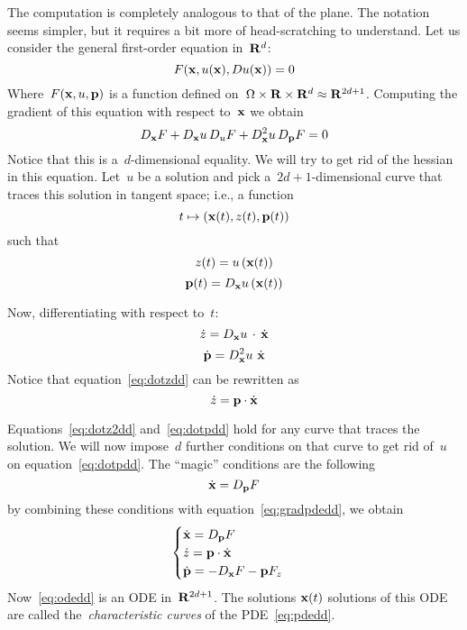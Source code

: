 The computation is completely analogous to that of the plane.  The notation
seems simpler, but it requires a bit more of head-scratching to understand.
Let us consider the general first-order equation in~$\mathbf{R}^d$:
\begin{equation}\label{eq:pdedd}
	F(\mathbf{x}, u(\mathbf{x}), Du(\mathbf{x})) = 0
\end{equation}
Where~$F(\mathbf{x},u,\mathbf{p})$ is a function defined
on~$\Omega\times\mathbf{R}\times\mathbf{R}^d\approx\mathbf{R}^{2d+1}$.  Computing the gradient of
this equation with respect to~$\mathbf{x}$ we obtain
\begin{equation}\label{eq:gradpdedd}
	D_{\mathbf{x}}F + D_{\mathbf{x}}u\,D_uF + D^2_{\mathbf{x}}u\,D_{\mathbf{p}}F = 0
\end{equation}
Notice that this is a~$d$-dimensional equality.  We will try to get rid of
the hessian in this equation.  Let~$u$ be a solution and pick
a~$2d+1$-dimensional curve that traces this solution in tangent space; i.e.,
a function
\begin{equation*}
	t\mapsto\left(
		\mathbf{x}(t),z(t),\mathbf{p}(t)
	\right)
\end{equation*}
such that
\begin{equation}
	z(t)=u\left(\mathbf{x}(t)\right)
\end{equation}
\begin{equation}
	\mathbf{p}(t)=D_{\mathbf{x}}u\left(\mathbf{x}(t)\right)
\end{equation}

Now, differentiating with respect to~$t$:
\begin{equation}\label{eq:dotzdd}
	\dot z=D_{\mathbf{x}}u\,\cdot\,\dot{\mathbf{x}}
\end{equation}
\begin{equation}\label{eq:dotpdd}
	\dot{\mathbf{p}}=D^2_{\mathbf{x}}u\  \dot{\mathbf{x}}
\end{equation}
Notice that equation~\ref{eq:dotzdd} can be rewritten as
\begin{equation}\label{eq:dotz2dd}\dot z=\mathbf{p}\cdot\dot{\mathbf{x}}\end{equation}

Equations~\ref{eq:dotz2dd} and~\ref{eq:dotpdd} hold for any
curve that traces the solution.  We will now impose~$d$ further
conditions on that curve to get rid of~$u$ on equation~\ref{eq:dotpdd}.
The ``magic'' conditions are the following
\begin{equation}
	\dot{\mathbf{x}} = D_{\mathbf{p}}F
\end{equation}
by combining these conditions with equation~\ref{eq:gradpdedd}, we obtain
\begin{equation}\label{eq:odedd}
	\begin{cases}
		\dot{\mathbf{x}} = D_{\mathbf{p}}F \\
		\dot z = \mathbf{p}\cdot\dot{\mathbf{x}} \\
		\dot{\mathbf{p}} = -D_{\mathbf{x}}F - \mathbf{p} F_z \\
	\end{cases}
\end{equation}
Now~\ref{eq:odedd} is an ODE in~$\mathbf{R}^{2d+1}$.
The solutions $\mathbf{x}(t)$ solutions
of this ODE are called the~\emph{characteristic curves} of the
PDE~\ref{eq:pdedd}.



